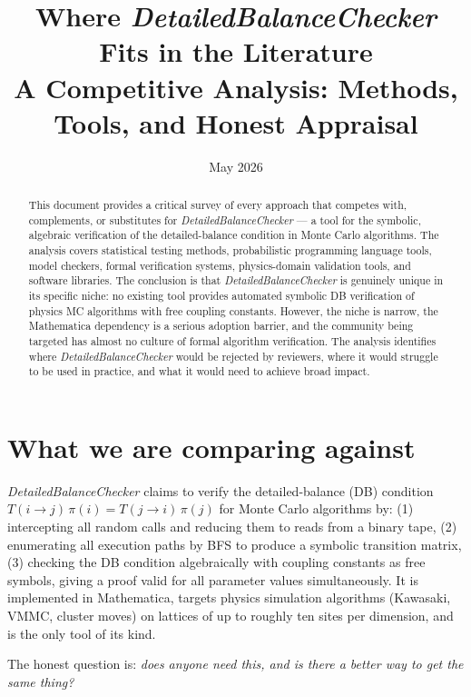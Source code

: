\documentclass[11pt,a4paper]{article}
\title{\textbf{Where \textit{DetailedBalanceChecker} Fits in the Literature}\\[4pt]
\large A Competitive Analysis: Methods, Tools, and Honest Appraisal}
\author{}
\date{May 2026}
\newcommand{\DBC}{\textit{DetailedBalanceChecker}}
\begin{document}
\maketitle
\thispagestyle{empty}

\begin{abstract}
\noindent
This document provides a critical survey of every approach that competes with,
complements, or substitutes for \DBC{} — a tool for the symbolic, algebraic
verification of the detailed-balance condition in Monte Carlo algorithms.  The
analysis covers statistical testing methods, probabilistic programming language
tools, model checkers, formal verification systems, physics-domain validation
tools, and software libraries.  The conclusion is that \DBC{} is genuinely unique
in its specific niche: no existing tool provides automated symbolic DB verification
of physics MC algorithms with free coupling constants.  However, the niche is
narrow, the Mathematica dependency is a serious adoption barrier, and the
community being targeted has almost no culture of formal algorithm verification.
The analysis identifies where \DBC{} would be rejected by reviewers, where it
would struggle to be used in practice, and what it would need to achieve broad
impact.
\end{abstract}

\tableofcontents
\newpage

\section{What we are comparing against}

\DBC{} claims to verify the detailed-balance (DB) condition
$T(i\to j)\,\pi(i) = T(j\to i)\,\pi(j)$
for Monte Carlo algorithms by:
(1) intercepting all random calls and reducing them to reads from a binary tape,
(2) enumerating all execution paths by BFS to produce a symbolic transition matrix,
(3) checking the DB condition algebraically with coupling constants as free symbols,
giving a proof valid for all parameter values simultaneously.
It is implemented in Mathematica, targets physics simulation algorithms (Kawasaki,
VMMC, cluster moves) on lattices of up to roughly ten sites per dimension, and is
the only tool of its kind.

The honest question is: \emph{does anyone need this, and is there a better way to
get the same thing?}
\end{document}
